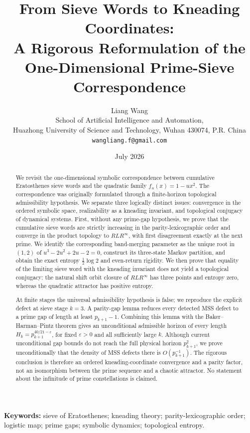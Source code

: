 \documentclass[11pt]{article}
\title{\textbf{From Sieve Words to Kneading Coordinates:}\\
A Rigorous Reformulation of the One-Dimensional Prime-Sieve Correspondence}
\author{Liang Wang\\
\small School of Artificial Intelligence and Automation,\\[-0.2em]
\small Huazhong University of Science and Technology, Wuhan 430074, P.R. China\\
\small \texttt{wangliang.f@gmail.com}}
\date{July 2026}
\theoremstyle{definition}
\theoremstyle{remark}
\newcommand{\eps}{\varepsilon}
\begin{document}
\maketitle

\begin{abstract}
We revisit the one-dimensional symbolic correspondence between cumulative Eratosthenes sieve words and the quadratic family $f_u(x)=1-u x^2$.  The correspondence was originally formulated through a finite-horizon topological admissibility hypothesis.  We separate three logically distinct issues: convergence in the ordered symbolic space, realizability as a kneading invariant, and topological conjugacy of dynamical systems.  First, without any prime-gap hypothesis, we prove that the cumulative sieve words are strictly increasing in the parity-lexicographic order and converge in the product topology to $RLR^\infty$, with first disagreement exactly at the next prime.  We identify the corresponding band-merging parameter as the unique root in $(1,2)$ of $u^3-2u^2+2u-2=0$, construct its three-state Markov partition, and obtain the exact entropy $\frac12\log 2$ and even-return rigidity.  We then prove that equality of the limiting sieve word with the kneading invariant does not yield a topological conjugacy: the natural shift orbit closure of $RLR^\infty$ has three points and entropy zero, whereas the quadratic attractor has positive entropy.

At finite stages the universal admissibility hypothesis is false; we reproduce the explicit defect at sieve stage $k=3$.  A parity-gap lemma reduces every detected MSS defect to a prime gap of length at least $p_{k+1}-1$.  Combining this lemma with the Baker--Harman--Pintz theorem gives an unconditional admissible horizon of every length $H_k=p_{k+1}^{40/21-\eps}$, for fixed $\eps>0$ and all sufficiently large $k$.  Although current unconditional gap bounds do not reach the full physical horizon $p_{k+1}^2$, we prove unconditionally that the density of MSS defects there is $O(p_{k+1}^{-1})$.  The rigorous conclusion is therefore an ordered kneading-coordinate convergence and a parity factor, not an isomorphism between the prime sequence and a chaotic attractor.  No statement about the infinitude of prime constellations is claimed.
\end{abstract}

\noindent\textbf{Keywords:} sieve of Eratosthenes; kneading theory; parity-lexicographic order; logistic map; prime gaps; symbolic dynamics; topological entropy.
\end{document}
